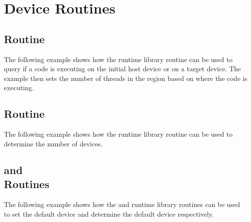 \pagebreak
\chapter{Device Routines}
\label{chap:device}

\section{ Routine}

The following example shows how the  runtime library routine 
can be used to query if a code is executing on the initial host device or on a 
target device. The example then sets the number of threads in the  
region based on where the code is executing.



\section{ Routine}

The following example shows how the  runtime library routine 
can be used to determine the number of devices.



\section{ and \\
 Routines}

The following example shows how the  and  
runtime library routines can be used to set the default device and determine the 
default device respectively.



